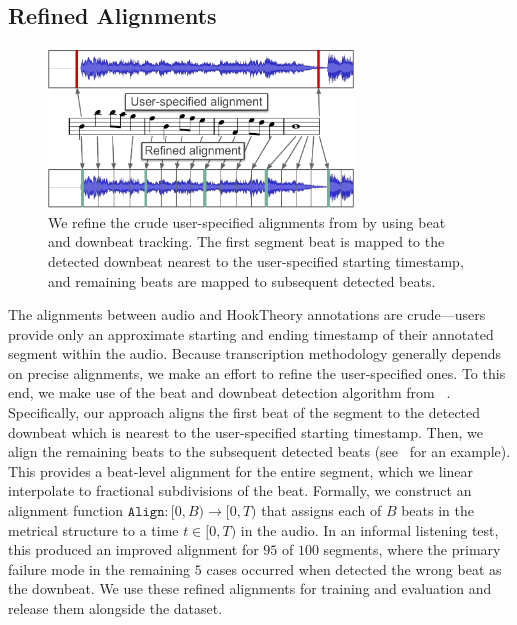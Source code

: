 \subsection{Refined Alignments}
\label{sec:align}

\begin{figure}
    \centering
    \includegraphics[width=8.1cm]{figs/alignment.pdf}
    \caption{We refine the crude user-specified alignments from \hooktheory{} by using beat and downbeat tracking. The first segment beat is mapped to the detected downbeat nearest to the user-specified starting timestamp, and remaining beats are mapped to subsequent detected beats.}
 \label{fig:alignment}
 \vspace{-5mm}
\end{figure}

The alignments between audio and HookTheory annotations are crude---users provide only an approximate starting and ending timestamp of their annotated segment within the audio. 
Because transcription methodology generally depends on precise alignments, we make an effort to refine the user-specified ones. 
To this end, we make use of the beat and downbeat detection algorithm from \madmom{}~\cite{bock2016joint,bock2016madmom}. 
Specifically, our approach aligns the first beat of the segment to the detected downbeat which is nearest to the user-specified starting timestamp. 
Then, we align the remaining beats to the subsequent detected beats (see~ for an example). 
This provides a beat-level alignment for the entire segment, which we linear interpolate to fractional subdivisions of the beat. 
Formally, we construct an alignment function $\texttt{Align} : [0,B) \to [0,T)$ that assigns each of $B$ beats in the metrical structure to a time $t \in [0,T)$ in the audio.
In an informal listening test, this produced an improved alignment for $95$ of $100$ segments, 
where the primary failure mode in the remaining $5$ cases occurred when \madmom{} detected the wrong beat as the downbeat. 
We use these refined alignments for training and evaluation and release them alongside the dataset.

